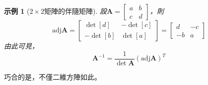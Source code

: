 \documentclass[12pt]{article}
\newcommand{\adj}{\mathrm{adj}}
\newtheorem*{example}{示例}
\begin{document}
    \begin{example}[$2\times 2$矩陣的伴隨矩陣]
        設$\mathbf{A}=\begin{bmatrix}
            a&b\\c&d
        \end{bmatrix}$，則$$\adj{\mathbf{A}}=\begin{bmatrix}
            \det[d]&-\det[c]\\-\det[b]&\det[a]
        \end{bmatrix}=\begin{bmatrix}
            d&-c\\-b&a
        \end{bmatrix}$$
        由此可見，$$\mathbf{A}^{-1}=\frac{1}{\det{\mathbf{A}}}(\adj{\mathbf{A}})^T$$
    \end{example}
    巧合的是，不僅二維方陣如此。
\end{document}
